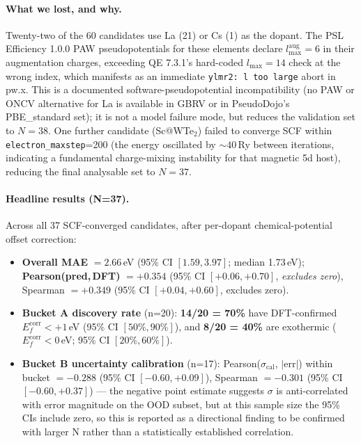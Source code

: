 \paragraph{What we lost, and why.}
Twenty-two of the 60 candidates use La (21) or Cs (1) as the
dopant. The PSL Efficiency 1.0.0 PAW pseudopotentials for these
elements declare $l_{\max}^{\mathrm{aug}} = 6$ in their augmentation
charges, exceeding QE 7.3.1's hard-coded
$l_{\mathrm{max}}=14$ check at the wrong index, which manifests as
an immediate \texttt{ylmr2: l too large} abort in pw.x. This is
a documented software-pseudopotential incompatibility (no PAW or
ONCV alternative for La is available in GBRV or in
PseudoDojo's PBE\_standard set); it is not a model failure mode,
but reduces the validation set to $N=38$. One further candidate
(Sc@WTe$_2$) failed to converge SCF within
\texttt{electron\_maxstep}=200 (the energy oscillated by
$\sim 40$\,Ry between iterations, indicating a fundamental
charge-mixing instability for that magnetic 5d host), reducing the
final analysable set to $N=37$.

\paragraph{Headline results (N=37).}
Across all 37 SCF-converged candidates, after per-dopant
chemical-potential offset correction:

\begin{itemize}
\item \textbf{Overall MAE} $= 2.66$\,eV (95\% CI $[1.59, 3.97]$;
  median 1.73\,eV);
  \textbf{Pearson(pred,\,DFT)} $= +0.354$ (95\% CI
  $[+0.06, +0.70]$, \emph{excludes zero}),
  Spearman $= +0.349$ (95\% CI $[+0.04, +0.60]$, excludes zero).
\item \textbf{Bucket A discovery rate} (n=20):
  \textbf{14/20 = 70\%} have DFT-confirmed
  $E_f^{\mathrm{corr}}<+1$\,eV (95\% CI $[50\%, 90\%]$), and
  \textbf{8/20 = 40\%} are exothermic
  ($E_f^{\mathrm{corr}}<0$\,eV; 95\% CI $[20\%, 60\%]$).
\item \textbf{Bucket B uncertainty calibration} (n=17):
  Pearson($\sigma_{\mathrm{cal}}$, $|\mathrm{err}|$) within bucket
  $= -0.288$ (95\% CI $[-0.60, +0.09]$),
  Spearman $= -0.301$ (95\% CI $[-0.60, +0.37]$) ---
  the negative point estimate suggests $\sigma$ is anti-correlated
  with error magnitude on the OOD subset, but at this sample size
  the 95\% CIs include zero, so this is reported as a
  directional finding to be confirmed with larger N rather than a
  statistically established correlation.
\end{itemize}


